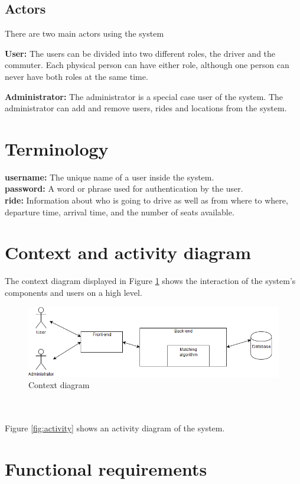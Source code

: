 \documentclass{article}
\begin{document}
\subsection{Actors}
There are two main actors using the system

\textbf{User:} The users can be divided into two different roles, the driver and the commuter. Each physical person can have either role, although one person can never have both roles at the same time.

\textbf{Administrator:} The administrator is a special case user of the system. The administrator can add and remove users, rides and locations from the system. 

\section{Terminology}
\textbf{username:} The unique name of a user inside the system.
\\
\textbf{password:} A word or phrase used for authentication by the user.
\\
\textbf{ride:} Information about who is going to drive as well as from where to where, departure time, arrival time, and the number of seats available.

\section{Context and activity diagram}
The context diagram displayed in Figure \ref{fig:context} shows the interaction of the system's components and users on a high level.
\begin{figure}
  \centering
  \includegraphics[scale=0.45]{Contextdiagram.png}
  \caption{Context diagram}
  \label{fig:context}
\end{figure}
\\ \\ 
Figure \ref{fig:activity} shows an activity diagram of the system.
\section{Functional requirements}
\end{document}
